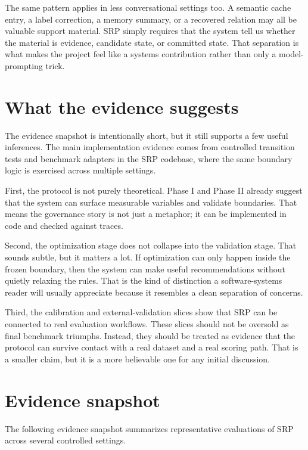 \documentclass[10pt]{article}
\begin{document}
The same pattern applies in less conversational settings too. A semantic cache entry, a label correction, a memory summary, or a recovered relation may all be valuable support material. SRP simply requires that the system tell us whether the material is evidence, candidate state, or committed state. That separation is what makes the project feel like a systems contribution rather than only a model-prompting trick.

\section{What the evidence suggests}
The evidence snapshot is intentionally short, but it still supports a few useful inferences. The main implementation evidence comes from controlled transition tests and benchmark adapters in the SRP codebase, where the same boundary logic is exercised across multiple settings.

First, the protocol is not purely theoretical. Phase I and Phase II already suggest that the system can surface measurable variables and validate boundaries. That means the governance story is not just a metaphor; it can be implemented in code and checked against traces.

Second, the optimization stage does not collapse into the validation stage. That sounds subtle, but it matters a lot. If optimization can only happen inside the frozen boundary, then the system can make useful recommendations without quietly relaxing the rules. That is the kind of distinction a software-systems reader will usually appreciate because it resembles a clean separation of concerns.

Third, the calibration and external-validation slices show that SRP can be connected to real evaluation workflows. These slices should not be oversold as final benchmark triumphs. Instead, they should be treated as evidence that the protocol can survive contact with a real dataset and a real scoring path. That is a smaller claim, but it is a more believable one for any initial discussion.

\section{Evidence snapshot}
The following evidence snapshot summarizes representative evaluations of SRP across several controlled settings.
\end{document}
